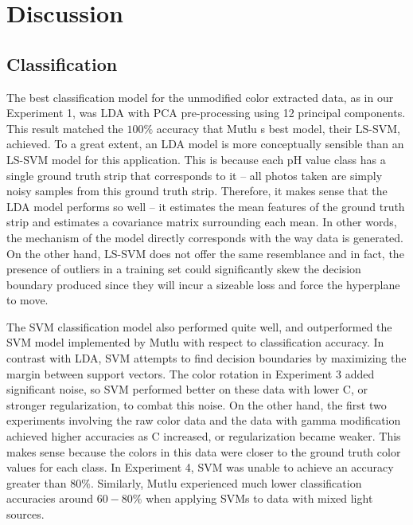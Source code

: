 \documentclass[journal]{IEEEtran}
\begin{document}
\section{Discussion}
\subsection{Classification}
The best classification model for the unmodified color extracted data, as in our Experiment 1, was LDA with PCA pre-processing using 12 principal components. This result matched the $100\%$ accuracy that Mutlu \textquotesingle s best model, their LS-SVM, achieved. To a great extent, an LDA model is more conceptually sensible than an LS-SVM model for this application. This is because each pH value class has a single ground truth strip that corresponds to it -- all photos taken are simply noisy samples from this ground truth strip. Therefore, it makes sense that the LDA model performs so well -- it estimates the mean features of the ground truth strip and estimates a covariance matrix surrounding each mean. In other words, the mechanism of the model directly corresponds with the way data is generated. On the other hand, LS-SVM does not offer the same resemblance and in fact, the presence of outliers in a training set could significantly skew the decision boundary produced since they will incur a sizeable loss and force the hyperplane to move.

The SVM classification model also performed quite well, and outperformed the SVM model implemented by Mutlu with respect to classification accuracy. In contrast with LDA, SVM attempts to find decision boundaries by maximizing the margin between support vectors. The color rotation in Experiment 3 added significant noise, so SVM performed better on these data with lower C, or stronger regularization, to combat this noise. On the other hand, the first two experiments involving the raw color data and the data with gamma modification achieved higher accuracies as C increased, or regularization became weaker. This makes sense because the colors in this data were closer to the ground truth color values for each class. In Experiment 4, SVM was unable to achieve an accuracy greater than $80\%$. Similarly, Mutlu experienced much lower classification accuracies around $60-80\%$ when applying SVMs to data with mixed light sources.
\end{document}
